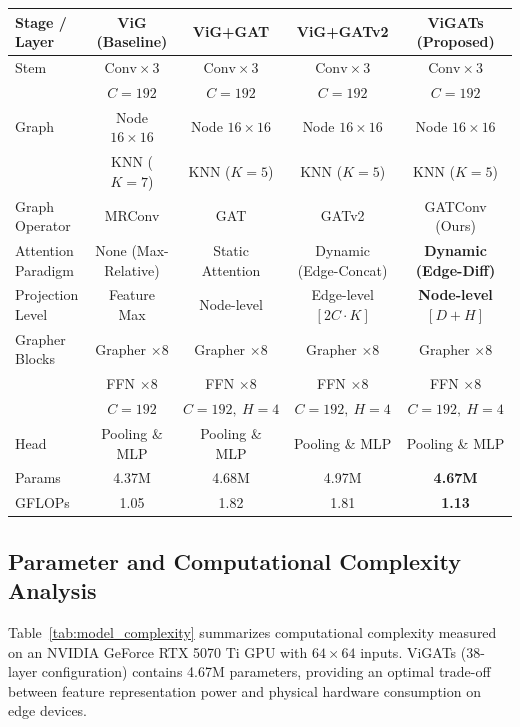 \documentclass[]{interact}
\theoremstyle{plain}
\theoremstyle{definition}
\theoremstyle{remark}
\begin{document}
{\begin{table}[H]
\centering
\small
{}
{\begin{tabular}{lcccc} \toprule
\textbf{Stage / Layer} & \textbf{ViG (Baseline)} & \textbf{ViG+GAT} & \textbf{ViG+GATv2} & ViGATs (Proposed) \\ \midrule
Stem & $\text{Conv} \times 3$ & $\text{Conv} \times 3$ & $\text{Conv} \times 3$ & $\text{Conv} \times 3$ \\
     & $C = 192$ & $C = 192$ & $C = 192$ & $C = 192$ \\ \midrule
Graph & Node $16 \times 16$ & Node $16 \times 16$ & Node $16 \times 16$ & Node $16 \times 16$ \\
      & KNN ($K=7$) & KNN ($K=5$) & KNN ($K=5$) & KNN ($K=5$) \\ \midrule
Graph Operator & MRConv \citep{han2022vision} & GAT \citep{velickovic2018graph} & GATv2 \citep{brody2022gat} & GATConv (Ours) \\
Attention Paradigm & None (Max-Relative) & Static Attention & Dynamic (Edge-Concat) & \textbf{Dynamic (Edge-Diff)} \\
Projection Level & Feature Max & Node-level & Edge-level $[2C \cdot K]$ & \textbf{Node-level $[D+H]$} \\ \midrule
Grapher Blocks & Grapher $\times 8$ & Grapher $\times 8$ & Grapher $\times 8$ & Grapher $\times 8$ \\
               & FFN $\times 8$ & FFN $\times 8$ & FFN $\times 8$ & FFN $\times 8$ \\
               & $C = 192$ & $C = 192,\ H = 4$ & $C = 192,\ H = 4$ & $C = 192,\ H = 4$ \\ \midrule
Head & Pooling \& MLP & Pooling \& MLP & Pooling \& MLP & Pooling \& MLP \\ \midrule
Params & 4.37M & 4.68M & 4.97M & \textbf{4.67M} \\
GFLOPs & 1.05 & 1.82 & 1.81 & \textbf{1.13} \\ \bottomrule
\end{tabular}}
\label{tab:gnn_architectures}
\end{table}

\subsection{Parameter and Computational Complexity Analysis}

Table~\ref{tab:model_complexity} summarizes computational complexity measured on an NVIDIA GeForce RTX 5070 Ti GPU with $64 \times 64$ inputs. ViGATs (38-layer configuration) contains 4.67M parameters, providing an optimal trade-off between feature representation power and physical hardware consumption on edge devices.

}
\end{document}
